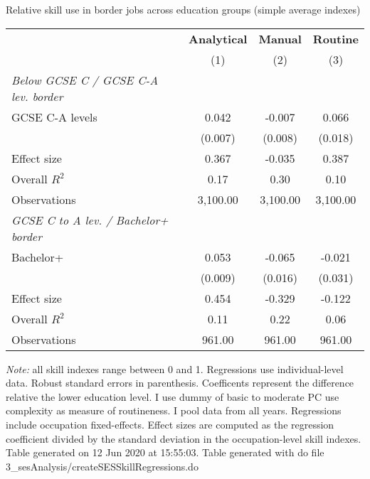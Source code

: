 \begin{center}
\begin{threeparttable}[!h]
\caption{Relative skill use in border jobs across education groups (simple average indexes)}
\label{tab:skillRegs}
\begin{tabular}{lccc}
\toprule
\toprule
&\multicolumn{1}{c}{\textbf{Analytical}}&\multicolumn{1}{c}{\textbf{Manual}}&\multicolumn{1}{c}{\textbf{Routine}} \\
\textbf{}&\multicolumn{1}{c}{(1)}&\multicolumn{1}{c}{(2)}&\multicolumn{1}{c}{(3)} \\
\midrule
\textit{Below GCSE C / GCSE C-A lev. border}\vspace{1mm} \\ 
\hspace{3mm}GCSE C-A levels&       0.042\sym{***}&      -0.007         &       0.066\sym{***}\\
                    &     (0.007)         &     (0.008)         &     (0.018)         \\
\hspace{3mm}Effect size&       0.367         &      -0.035         &       0.387         \\
\midrule Overall $ R^2$&        0.17         &        0.30         &        0.10         \\
Observations        &    3,100.00         &    3,100.00         &    3,100.00         \\
\midrule\textit{GCSE C to A lev. / Bachelor+ border}\vspace{1mm} \\ 
\hspace{3mm}Bachelor+&       0.053\sym{***}&      -0.065\sym{***}&      -0.021         \\
                    &     (0.009)         &     (0.016)         &     (0.031)         \\
\hspace{3mm}Effect size&       0.454         &      -0.329         &      -0.122         \\
\midrule Overall $ R^2$&        0.11         &        0.22         &        0.06         \\
Observations        &      961.00         &      961.00         &      961.00         \\
\bottomrule
\bottomrule
\end{tabular}
\begin{tablenotes}
\item \footnotesize \textit{Note:} all skill indexes range between 0 and 1. Regressions use individual-level data. Robust standard errors in parenthesis. Coefficents represent the difference relative the lower education level. I use dummy of basic to moderate PC use complexity as measure of routineness. I pool data from all years. Regressions include occupation fixed-effects. Effect sizes are computed as the regression coefficient divided by the standard deviation in the occupation-level skill indexes. Table generated on 12 Jun 2020 at 15:55:03. Table generated with do file 3\_sesAnalysis/createSESSkillRegressions.do
\end{tablenotes}
\end{threeparttable}
\end{center}
